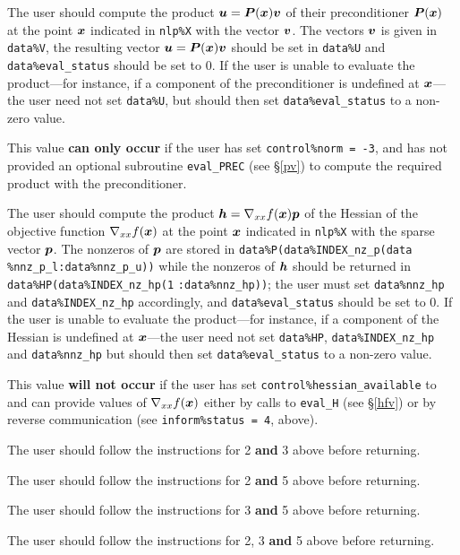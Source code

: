\documentclass{galahad}
\begin{document}
\begin{description}
 The user should compute the product ${\bm{u}} = {\bm{P}}({\bm{x}}){\bm{v}}$
     of their preconditioner ${\bm{P}}({\bm{x}})$ at the point ${\bm{x}}$
     indicated in {\tt nlp\%X} with the vector ${\bm{v}}$.
     The vectors ${\bm{v}}$ is given in {\tt data\%V}, the
     resulting vector ${\bm{u}} = {\bm{P}}({\bm{x}}){\bm{v}}$ should be set in {\tt data\%U}
     and {\tt data\%eval\_status}
     should be set to 0. If the user is unable to evaluate the product---for
     instance, if a component of the preconditioner is undefined at
     ${\bm{x}}$---the user need not set {\tt data\%U}, but should then set
     {\tt data\%eval\_status} to a non-zero value.

     \noindent
     This value {\bf can only occur} if the user has set 
     {\tt control\%norm = -3}, and has not provided an optional
     subroutine {\tt eval\_PREC} (see \S\ref{pv}) to compute the required
     product with the preconditioner.

 The user should compute the product
     ${\bm{h}} = \nabla_{xx} f({\bm{x}}){\bm{p}}$ of the Hessian
     of the objective function $\nabla_{xx} f({\bm{x}})$ at the point ${\bm{x}}$
     indicated in {\tt nlp\%X} with the sparse vector ${\bm{p}}$.
     The nonzeros of ${\bm{p}}$ are stored in
     {\tt data\%P(data\%INDEX\_nz\_p(data}
     {\tt \%nnz\_p\_l:data\%nnz\_p\_u))}
     while the nonzeros of ${\bm{h}}$ should be returned in
     {\tt data\%HP(data\%INDEX\_nz\_hp(1}
     {\tt :data\%nnz\_hp))}; the user must set 
     {\tt data\%nnz\_hp} and {\tt data\%INDEX\_nz\_hp} accordingly,
     and  {\tt data\%eval\_status} should be set to 0. If the user is
     unable to evaluate the product---for instance, if a component of 
     the Hessian is undefined at ${\bm{x}}$---the user need not set 
     {\tt data\%HP}, {\tt data\%INDEX\_nz\_hp} and {\tt data\%nnz\_hp}
     but should then set {\tt data\%eval\_status} to a non-zero value.

     \noindent
     This value {\bf will not occur} if the user has set 
     {\tt control\%hessian\_available} to \true\, and can provide
     values of $\nabla_{xx} f({\bm{x}})$  either by calls to {\tt eval\_H} 
     (see \S\ref{hfv}) or by reverse communication (see 
     {\tt inform\%status = 4}, above).

 The user should follow the instructions for 2 {\bf and} 3 
     above before returning.

 The user should follow the instructions for 2 {\bf and} 5
     above before returning.

 The user should follow the instructions for 3 {\bf and} 5
     above before returning.

 The user should follow the instructions for 2, 3 {\bf and} 5 
     above before returning.

\end{description}
\end{document}
